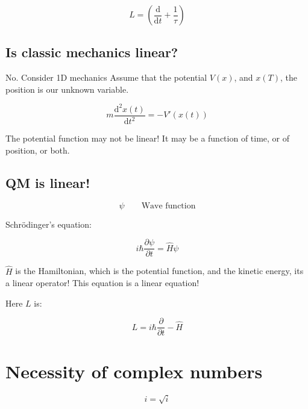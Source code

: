 \documentclass[a4paper]{article}
\renewcommand{\d}{\mathrm{d}}
\begin{document}
    \begin{equation*}
        L = \left( \frac{\d }{\d t} + \frac{1}{\tau} \right)
    \end{equation*}
    
    \subsection{Is classic mechanics linear?}

    No. Consider 1D mechanics Assume that the potential $V(x)$, and $x(T)$, the position is our unknown variable.

    \begin{equation*}
        m \frac{\d ^ 2 x(t)}{\d t^2} = - V' \left( x(t) \right)
    \end{equation*}

    The potential function may not be linear! It may be a function of time, or of position, or both.
    
    \subsection{QM is linear!}

    \begin{equation*}
        \psi \qquad \text{Wave function}
    \end{equation*}

    Schrödinger's equation:

    \begin{equation*}
        i \hbar \frac{\partial \psi}{\partial t} = \hat{H} \psi
    \end{equation*}
    

    $\hat{H}$ is the Hamiltonian, which is the potential function, and the kinetic energy, its a linear operator! This equation is a linear equation!
    
    Here $L$ is: 

    \begin{equation*}
        L =  i \hbar \frac{\partial}{\partial t} - \hat{H}
    \end{equation*}

    \section{Necessity of complex numbers}
    
    \begin{equation*}
        i = \sqrt{i}
    \end{equation*}
\end{document}
